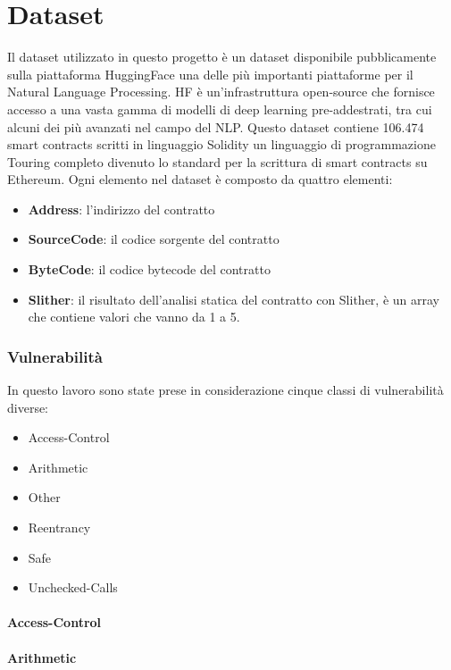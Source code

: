 \documentclass[../../Thesis.tex]{subfiles}
\begin{document}
\chapter{Dataset}
Il dataset \cite{rossini2022slitherauditedcontracts} utilizzato in questo progetto è un dataset disponibile pubblicamente sulla piattaforma HuggingFace una delle più importanti piattaforme per il Natural Language Processing. HF è un'infrastruttura open-source che fornisce accesso a una vasta gamma di modelli di deep learning pre-addestrati, tra cui alcuni dei più avanzati nel campo del NLP.
Questo dataset contiene 106.474 smart contracts scritti in linguaggio Solidity un linguaggio di programmazione Touring completo divenuto lo standard per la scrittura di smart contracts su Ethereum. Ogni elemento nel dataset è composto da quattro elementi:
\begin{itemize}
    \item  \textbf{Address}: l'indirizzo del contratto
    \item  \textbf{SourceCode}: il codice sorgente del contratto
    \item  \textbf{ByteCode}: il codice bytecode del contratto
    \item  \textbf{Slither}: il risultato dell'analisi statica del contratto con Slither, è un array che contiene valori che vanno da 1 a 5. 
\end{itemize}
\subsection{Vulnerabilità}
In questo lavoro sono state prese in considerazione cinque classi di vulnerabilità diverse: 
\begin{itemize}
    \item Access-Control
    \item Arithmetic
    \item Other
    \item Reentrancy
    \item Safe
    \item Unchecked-Calls
\end{itemize}

\subsubsection{Access-Control}

\subsubsection{Arithmetic}
\end{document}
